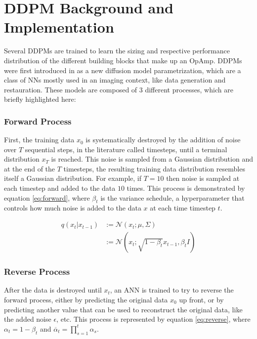 \documentclass[conference]{IEEEtran}
\begin{document}
\section{DDPM Background and Implementation}\label{sec:ddpm}
	Several DDPMs are trained to learn the sizing and respective performance distribution of the different building blocks that make up an OpAmp. DDPMs were first introduced in \cite{ho2020denoisingdiffusionprobabilisticmodels} as a new diffusion model parametrization, which are a class of NNs mostly used in an imaging context, like data generation and restauration. These models are composed of 3 different processes, which are briefly highlighted here:
	
	\subsubsection{Forward Process}
	First, the training data $x_{0}$ is systematically destroyed by the addition of noise over $T$ sequential steps, in the literature called timesteps, until a terminal distribution $x_{T}$ is reached. This noise is sampled from a Gaussian distribution and at the end of the $T$ timesteps, the resulting training data distribution resembles itself a Gaussian distribution. For example, if $T=10$ then noise is sampled at each timestep and added to the data $10$ times. This process is demonstrated by equation \ref{eq:forward}, where $\beta_{t}$ is the variance schedule, a hyperparameter that controls how much noise is added to the data $x$ at each time timestep $t$.
	
	\begin{equation} \label{eq:forward}
	\begin{aligned}
	q(x_{t}|x_{t-1}) &:= \mathcal{N}(x_{t};\mu,\Sigma) \\ &:= \mathcal{N}(x_{t};\sqrt{1-\beta_{t}}x_{t-1}, \beta_{t}I)
	\end{aligned}
	\end{equation}
	
	\subsubsection{Reverse Process}
	After the data is destroyed until $x_{t}$, an ANN is trained to try to reverse the forward process, either by predicting the original data $x_{0}$ up front, or by predicting another value that can be used to reconstruct the original data, like the added noise $\epsilon$, etc. This process is represented by equation \ref{eq:reverse}, where $\alpha_{t}=1-\beta_{t}$ and $\overline{\alpha}_{t}=\prod_{s=1}^{t}\alpha_{s}$.
	
\end{document}
